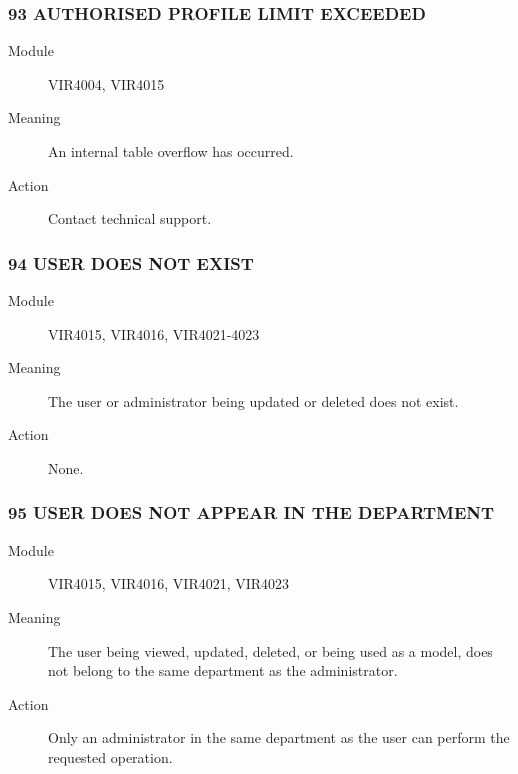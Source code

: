 \documentclass[letterpaper,10pt,english]{sphinxmanual}
\begin{document}
\subsubsection{93 AUTHORISED PROFILE LIMIT EXCEEDED}
\label{\detokenize{messages:authorised-profile-limit-exceeded}}\begin{description}
\item[{Module}] \leavevmode
VIR4004, VIR4015

\item[{Meaning}] \leavevmode
An internal table overflow has occurred.

\item[{Action}] \leavevmode
Contact technical support.

\end{description}


\subsubsection{94 USER DOES NOT EXIST}
\label{\detokenize{messages:user-does-not-exist}}\begin{description}
\item[{Module}] \leavevmode
VIR4015, VIR4016, VIR4021-4023

\item[{Meaning}] \leavevmode
The user or administrator being updated or deleted does not exist.

\item[{Action}] \leavevmode
None.

\end{description}


\subsubsection{95 USER DOES NOT APPEAR IN THE DEPARTMENT}
\label{\detokenize{messages:user-does-not-appear-in-the-department}}\begin{description}
\item[{Module}] \leavevmode
VIR4015, VIR4016, VIR4021, VIR4023

\item[{Meaning}] \leavevmode
The user being viewed, updated, deleted, or being used as a model, does not belong to the same department as the administrator.

\item[{Action}] \leavevmode
Only an administrator in the same department as the user can perform the requested operation.

\end{description}
\end{document}
